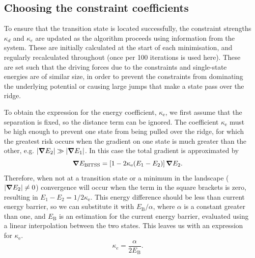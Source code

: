 \subsection{Choosing the constraint coefficients}\label{sec:bitss-coefficients}
To ensure that the transition state is located successfully, the constraint strengths $\kappa_d$ and $\kappa_e$ are updated as the algorithm proceeds using information from the system.
These are initially calculated at the start of each minimisation, and regularly recalculated throughout (once per 100 iterations is used here).
These are set such that the driving forces due to the constraints and single-state energies are of similar size, in order to prevent the constraints from dominating the underlying potential or causing large jumps that make a state pass over the ridge.

To obtain the expression for the energy coefficient, $\kappa_\text{e}$, we first assume that the separation is fixed, so the distance term can be ignored.
The coefficient $\kappa_\text{e}$ must be high enough to prevent one state from being pulled over the ridge, for which the greatest risk occurs when the gradient on one state is much greater than the other, e.g. $\left| \bm{\nabla} E_2 \right| \gg \left| \bm{\nabla} E_1 \right|$.
In this case the total gradient is approximated by
\begin{equation}
  \bm{\nabla} E_\text{BITSS} = \left[ 1 - 2 \kappa_\text{e} (E_1 - E_2) \right] \bm{\nabla} E_2.
\end{equation}
Therefore, when not at a transition state or a minimum in the landscape ($\left| \bm{\nabla} E_2 \right| \neq 0$) convergence will occur when the term in the square brackets is zero, resulting in $E_1 - E_2 = 1 / 2 \kappa_\text{e}$.
This energy difference should be less than current energy barrier, so we can substitute it with $E_\text{B} / \alpha$, where $\alpha$ is a constant greater than one, and $E_\text{B}$ is an estimation for the current energy barrier, evaluated using a linear interpolation between the two states.
This leaves us with an expression for $\kappa_\text{e}$.
\begin{equation}
  \kappa_e = \frac {\alpha} {2 E_\mathrm{B}}.
  \label{eq:bitss-ke}
\end{equation}

